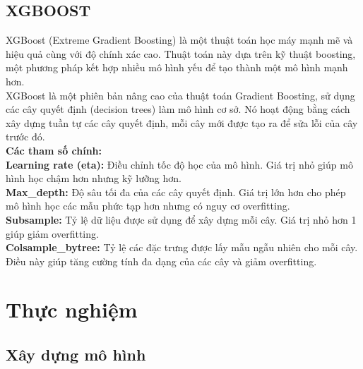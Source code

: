 \documentclass[conference]{IEEEtran}
\begin{document}
	\subsection{XGBOOST}
	XGBoost (Extreme Gradient Boosting) là một thuật toán học máy mạnh mẽ và hiệu quả cùng với độ chính xác cao. Thuật toán này dựa trên kỹ thuật boosting, một phương pháp kết hợp nhiều mô hình yếu để tạo thành một mô hình mạnh hơn.\\
	XGBoost là một phiên bản nâng cao của thuật toán Gradient Boosting, sử dụng các cây quyết định (decision trees) làm mô hình cơ sở. Nó hoạt động bằng cách xây dựng tuần tự các cây quyết định, mỗi cây mới được tạo ra để sửa lỗi của cây trước đó.\\
	\textbf{Các tham số chính:}\\
	\textbf{Learning rate (eta):} Điều chỉnh tốc độ học của mô hình. Giá trị nhỏ giúp mô hình học chậm hơn nhưng kỹ lưỡng hơn.\\
	\textbf{Max\_depth:} Độ sâu tối đa của các cây quyết định. Giá trị lớn hơn cho phép mô hình học các mẫu phức tạp hơn nhưng có nguy cơ overfitting.\\
	\textbf{Subsample:} Tỷ lệ dữ liệu được sử dụng để xây dựng mỗi cây. Giá trị nhỏ hơn 1 giúp giảm overfitting.\\
	\textbf{Colsample\_bytree:} Tỷ lệ các đặc trưng được lấy mẫu ngẫu nhiên cho mỗi cây. Điều này giúp tăng cường tính đa dạng của các cây và giảm overfitting.\\
	
	\section{Thực nghiệm}
	
	\subsection{Xây dựng mô hình}
	
\end{document}
